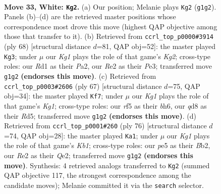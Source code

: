 \documentclass[11pt]{article}
\begin{document}
\clearpage

\begin{figure}[p]\centering
\begin{subfigure}{0.46\textwidth}\centering
\resizebox{\linewidth}{!}{%
\newchessgame
\chessboard[
  setfen={r1bq2k1/8/8/4pr1p/2p4P/p1P3P1/P1QBR3/3R2K1 w - - 8 33},
  showmover=false,
  pgfstyle=straightmove, color=movearrow, markmove={g1-g2}
]}
\caption{}
\end{subfigure}\hfill
\begin{subfigure}{0.46\textwidth}\centering
\resizebox{\linewidth}{!}{%
\newchessgame
\chessboard[
  setfen={2r4k/1q3r1p/3B2pP/p1p5/2Q1R2P/4P3/P4PK1/8 w - - 1 35},
  showmover=false,
  pgfstyle=straightmove, color=movearrow, markmove={g2-g3}
]}
\caption{}
\end{subfigure}
\\[4pt]
\begin{subfigure}{0.46\textwidth}\centering
\resizebox{\linewidth}{!}{%
\newchessgame
\chessboard[
  setfen={6k1/7p/p1pq3B/3r1bP1/1P1P1p2/8/P3QP2/3R2K1 b - - 0 34},
  showmover=false,
  pgfstyle=straightmove, color=movearrow, markmove={g8-f7}
]}
\caption{}
\end{subfigure}\hfill
\begin{subfigure}{0.46\textwidth}\centering
\resizebox{\linewidth}{!}{%
\newchessgame
\chessboard[
  setfen={3r4/6pk/3rq3/p3p3/1pP1P3/1P1P2P1/1B2Q3/1K1R4 w - - 1 39},
  showmover=false,
  pgfstyle=straightmove, color=movearrow, markmove={b1-a1}
]}
\caption{}
\end{subfigure}
\caption{\textbf{Move 33, White: \texttt{Kg2}.} (a) Our position; Melanie plays \texttt{Kg2} (\texttt{g1g2}). Panels (b)--(d) are the retrieved master positions whose correspondence most drove this move (highest QAP objective among those that transfer to it). (b) Retrieved from \texttt{ccrl\_top\_p0000\#3914} (ply 68) [structural distance $d$=81, QAP obj=52]: the master played \texttt{Kg3}; under $\mu$ our \emph{Kg1} plays the role of that game's \emph{Kg2}; cross-type roles: our \emph{R}d1 as their \emph{P}a2, our \emph{R}e2 as their \emph{P}e3; transferred move \texttt{g1g2} \textbf{(endorses this move)}. (c) Retrieved from \texttt{ccrl\_top\_p0003\#2606} (ply 67) [structural distance $d$=75, QAP obj=34]: the master played \texttt{Kf7}; under $\mu$ our \emph{Kg1} plays the role of that game's \emph{Kg1}; cross-type roles: our \emph{r}f5 as their \emph{b}h6, our \emph{q}d8 as their \emph{R}d5; transferred move \texttt{g1g2} \textbf{(endorses this move)}. (d) Retrieved from \texttt{ccrl\_top\_p0001\#260} (ply 76) [structural distance $d$=74, QAP obj=28]: the master played \texttt{Ka1}; under $\mu$ our \emph{Kg1} plays the role of that game's \emph{Kb1}; cross-type roles: our \emph{p}e5 as their \emph{B}b2, our \emph{R}e2 as their \emph{Q}e2; transferred move \texttt{g1g2} \textbf{(endorses this move)}. Synthesis: 4 retrieved analogs transferred to \texttt{Kg2} (summed QAP objective 117, the strongest correspondence among the candidate moves); Melanie committed it via the \texttt{search} selector.}
\label{fig:thought-m64}
\end{figure}
\end{document}
